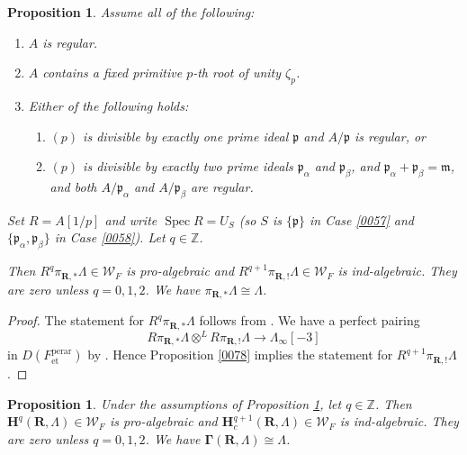 \documentclass{amsart}
\newtheorem{Prop}[Thm]{Proposition}
\theoremstyle{remark}
\numberwithin{equation}{section}
\newcommand{\tensor}{\mathbin{\otimes}}
\newcommand{\Z}{\mathbb{Z}}
\newcommand{\et}{\mathrm{et}}
\newcommand{\perar}{\mathrm{perar}}
\newcommand{\alg}[1]{\mathbf{#1}}
\newcommand{\ideal}[1]{\mathfrak{#1}}
\DeclareMathOperator{\Spec}{Spec}
\begin{document}
\begin{Prop} \label{0019}
	Assume all of the following:
	\begin{enumerate}
		\item \label{0053}
			$A$ is regular.
		\item \label{0055}
			$A$ contains a fixed primitive $p$-th root of unity $\zeta_{p}$.
		\item \label{0056}
			Either of the following holds:
			\begin{enumerate}
				\item \label{0057}
					$(p)$ is divisible by exactly one prime ideal $\ideal{p}$
					and $A / \ideal{p}$ is regular, or
				\item \label{0058}
					$(p)$ is divisible by exactly two prime ideals
					$\ideal{p}_{\alpha}$ and $\ideal{p}_{\beta}$,
					and $\ideal{p}_{\alpha} + \ideal{p}_{\beta} = \ideal{m}$,
					and both $A / \ideal{p}_{\alpha}$ and $A / \ideal{p}_{\beta}$ are regular.
			\end{enumerate}
	\end{enumerate}
	Set $R = A[1 / p]$ and write $\Spec R = U_{S}$
	(so $S$ is $\{\ideal{p}\}$ in Case \eqref{0057} and
	$\{\ideal{p}_{\alpha}, \ideal{p}_{\beta}\}$ in Case \eqref{0058}).
	Let $q \in \Z$.
	
	Then $R^{q} \pi_{\alg{R}, \ast} \Lambda \in \mathcal{W}_{F}$ is pro-algebraic
	and $R^{q + 1} \pi_{\alg{R}, !} \Lambda \in \mathcal{W}_{F}$ is ind-algebraic.
	They are zero unless $q = 0, 1, 2$.
	We have $\pi_{\alg{R}, \ast} \Lambda \cong \Lambda$.
\end{Prop}

\begin{proof}
	The statement for $R^{q} \pi_{\alg{R}, \ast} \Lambda$ follows from
	\cite[Proposition 10.3.5]{Suz24}.
	We have a perfect pairing
		\[
					R \pi_{\alg{R}, \ast} \Lambda
				\tensor^{L}
					R \pi_{\alg{R}, !} \Lambda
			\to
				\Lambda_{\infty}[-3]
		\]
	in $D(F^{\perar}_{\et})$ by \cite[Proposition 10.1.5]{Suz24}.
	Hence Proposition \ref{0078} implies the statement for $R^{q + 1} \pi_{\alg{R}, !} \Lambda$.
\end{proof}

\begin{Prop} \label{0021}
	Under the assumptions of Proposition \ref{0019},
	let $q \in \Z$.
	Then $\alg{H}^{q}(\alg{R}, \Lambda) \in \mathcal{W}_{F}$ is pro-algebraic
	and $\alg{H}^{q + 1}_{c}(\alg{R}, \Lambda) \in \mathcal{W}_{F}$ is ind-algebraic.
	They are zero unless $q = 0, 1, 2$.
	We have $\alg{\Gamma}(\alg{R}, \Lambda) \cong \Lambda$.
\end{Prop}
\end{document}

